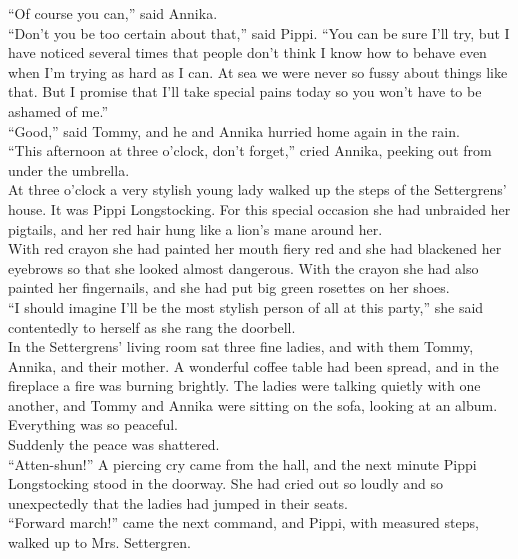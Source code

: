\documentclass{standard}
\begin{document}
“Of course you can,” said Annika.\\

“Don’t you be too certain about that,” said Pippi. “You can be sure I’ll try, but I have noticed several times that people don’t think I know how to behave even when I’m trying as hard as I can. At sea we were never so fussy about things like that. But I promise that I’ll take special pains today so you won’t have to be ashamed of me.”\\

“Good,” said Tommy, and he and Annika hurried home again in the rain.\\

“This afternoon at three o’clock, don’t forget,” cried Annika, peeking out from under the umbrella.\\

At three o’clock a very stylish young lady walked up the steps of the Settergrens’ house. It was Pippi Longstocking. For this special occasion she had unbraided her pigtails, and her red hair hung like a lion’s mane around her.\\

With red crayon she had painted her mouth fiery red and she had blackened her eyebrows so that she looked almost dangerous. With the crayon she had also painted her fingernails, and she had put big green rosettes on her shoes.\\

“I should imagine I’ll be the most stylish person of all at this party,” she said contentedly to herself as she rang the doorbell.\\

In the Settergrens’ living room sat three fine ladies, and with them Tommy, Annika, and their mother. A wonderful coffee table had been spread, and in the fireplace a fire was burning brightly. The ladies were talking quietly with one another, and Tommy and Annika were sitting on the sofa, looking at an album. Everything was so peaceful.\\

Suddenly the peace was shattered.\\

“Atten-shun!” A piercing cry came from the hall, and the next minute Pippi Longstocking stood in the doorway. She had cried out so loudly and so unexpectedly that the ladies had jumped in their seats.\\

“Forward march!” came the next command, and Pippi, with measured steps, walked up to Mrs. Settergren.\\
\end{document}
